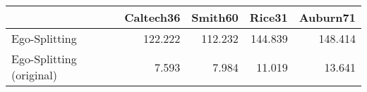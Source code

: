 \begin{tabular}{lrrrr}
\toprule
{} & Caltech36 & Smith60 &  Rice31 & Auburn71 \\
\midrule
Ego-Splitting            &   122.222 & 112.232 & 144.839 &  148.414 \\
Ego-Splitting (original) &     7.593 &   7.984 &  11.019 &   13.641 \\
\bottomrule
\end{tabular}
